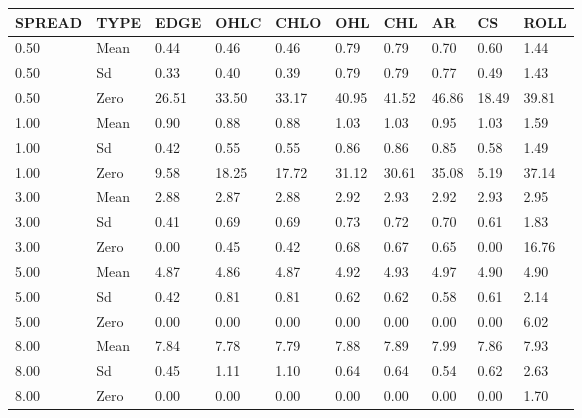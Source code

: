 \begin{table}[ht]
\centering
\begin{tabular}{llllllllll}
  \hline
SPREAD & TYPE & EDGE & OHLC & CHLO & OHL & CHL & AR & CS & ROLL \\ 
  \hline
0.50 & Mean & 0.44 & 0.46 & 0.46 & 0.79 & 0.79 & 0.70 & 0.60 & 1.44 \\ 
  0.50 & Sd & 0.33 & 0.40 & 0.39 & 0.79 & 0.79 & 0.77 & 0.49 & 1.43 \\ 
  0.50 & Zero & 26.51 & 33.50 & 33.17 & 40.95 & 41.52 & 46.86 & 18.49 & 39.81 \\ 
  1.00 & Mean & 0.90 & 0.88 & 0.88 & 1.03 & 1.03 & 0.95 & 1.03 & 1.59 \\ 
  1.00 & Sd & 0.42 & 0.55 & 0.55 & 0.86 & 0.86 & 0.85 & 0.58 & 1.49 \\ 
  1.00 & Zero & 9.58 & 18.25 & 17.72 & 31.12 & 30.61 & 35.08 & 5.19 & 37.14 \\ 
  3.00 & Mean & 2.88 & 2.87 & 2.88 & 2.92 & 2.93 & 2.92 & 2.93 & 2.95 \\ 
  3.00 & Sd & 0.41 & 0.69 & 0.69 & 0.73 & 0.72 & 0.70 & 0.61 & 1.83 \\ 
  3.00 & Zero & 0.00 & 0.45 & 0.42 & 0.68 & 0.67 & 0.65 & 0.00 & 16.76 \\ 
  5.00 & Mean & 4.87 & 4.86 & 4.87 & 4.92 & 4.93 & 4.97 & 4.90 & 4.90 \\ 
  5.00 & Sd & 0.42 & 0.81 & 0.81 & 0.62 & 0.62 & 0.58 & 0.61 & 2.14 \\ 
  5.00 & Zero & 0.00 & 0.00 & 0.00 & 0.00 & 0.00 & 0.00 & 0.00 & 6.02 \\ 
  8.00 & Mean & 7.84 & 7.78 & 7.79 & 7.88 & 7.89 & 7.99 & 7.86 & 7.93 \\ 
  8.00 & Sd & 0.45 & 1.11 & 1.10 & 0.64 & 0.64 & 0.54 & 0.62 & 2.63 \\ 
  8.00 & Zero & 0.00 & 0.00 & 0.00 & 0.00 & 0.00 & 0.00 & 0.00 & 1.70 \\ 
   \hline
\end{tabular}
\end{table}
